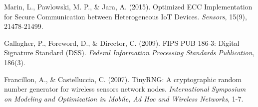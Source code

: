 \begin{thebibliography}{99}
 Marin, L., Pawlowski, M. P., \& Jara, A. (2015). Optimized ECC Implementation for Secure Communication between Heterogeneous IoT Devices. \textit{Sensors}, 15(9), 21478-21499.

 Gallagher, P., Foreword, D., \& Director, C. (2009). FIPS PUB 186-3: Digital Signature Standard (DSS). \textit{Federal Information Processing Standards Publication}, 186(3).

 Francillon, A., \& Castelluccia, C. (2007). TinyRNG: A cryptographic random number generator for wireless sensors network nodes. \textit{International Symposium on Modeling and Optimization in Mobile, Ad Hoc and Wireless Networks}, 1-7.


\end{thebibliography} 